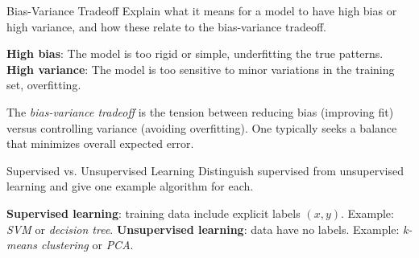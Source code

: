 \documentclass{article}
\begin{document}
\begin{exercise}{Bias-Variance Tradeoff}
  Explain what it means for a model to have high bias or high variance, and how these relate to the bias-variance tradeoff.

  \begin{solution}
    \textbf{High bias}: The model is too rigid or simple, underfitting the true patterns.  
    \textbf{High variance}: The model is too sensitive to minor variations in the training set, overfitting.  

    The \emph{bias-variance tradeoff} is the tension between reducing bias (improving fit) versus controlling variance (avoiding overfitting). One typically seeks a balance that minimizes overall expected error.
  \end{solution}
\end{exercise}

\begin{exercise}{Supervised vs. Unsupervised Learning}
  Distinguish supervised from unsupervised learning and give one example algorithm for each.

  \begin{solution}
    \textbf{Supervised learning}: training data include explicit labels $(x,y)$. Example: \emph{SVM} or \emph{decision tree}.  
    \textbf{Unsupervised learning}: data have no labels. Example: \emph{k-means clustering} or \emph{PCA}.
  \end{solution}
\end{exercise}
\end{document}
